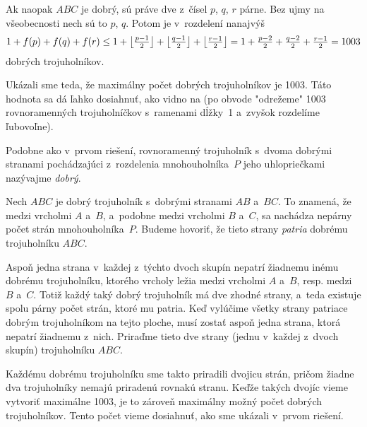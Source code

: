 {Ak naopak $ABC$ je dobrý, sú práve dve z~čísel $p$, $q$, $r$ párne. Bez ujmy na všeobecnosti nech sú to $p$, $q$. Potom je v~rozdelení nanajvýš
$$
1+f(p)+f(q)+f(r) \le 1+\left\lfloor\tfrac{p-1}2\right\rfloor+\left\lfloor\tfrac{q-1}2\right\rfloor+\left\lfloor\tfrac{r-1}2\right\rfloor = 1+\tfrac{p-2}2+\tfrac{q-2}2+\tfrac{r-1}2=1003
$$
dobrých trojuholníkov.

Ukázali sme teda, že maximálny počet dobrých trojuholníkov je 1003. Táto hodnota sa dá ľahko dosiahnuť, ako vidno na \obr{} (po obvode "odrežeme" 1003 rovnoramenných trojuholníčkov s~ramenami dĺžky~1 a~zvyšok rozdelíme ľubovoľne).

\ineriesenie
Podobne ako v~prvom riešení, rovnoramenný trojuholník s~dvoma dobrými stranami pochádzajúci z~rozdelenia mnohouholníka~$P$ jeho uhlopriečkami nazývajme {\it dobrý}.

Nech $ABC$ je dobrý trojuholník s~dobrými stranami $AB$ a~$BC$. To znamená, že medzi vrcholmi $A$ a~$B$, a~podobne medzi vrcholmi $B$ a~$C$, sa nachádza nepárny počet strán mnohouholníka~$P$. Budeme hovoriť, že tieto strany {\it patria\/} dobrému trojuholníku $ABC$.

Aspoň jedna strana v~každej z~týchto dvoch skupín nepatrí žiadnemu inému dobrému trojuholníku, ktorého vrcholy ležia medzi vrcholmi $A$ a~$B$, resp. medzi $B$ a~$C$. Totiž každý taký dobrý trojuholník má dve zhodné strany, a~teda existuje spolu párny počet strán, ktoré mu patria. Keď vylúčime všetky strany patriace dobrým trojuholníkom na tejto ploche, musí zostať aspoň jedna strana, ktorá nepatrí žiadnemu z~nich. Priraďme tieto dve strany (jednu v~každej z~dvoch skupín) trojuholníku $ABC$. 

Každému dobrému trojuholníku sme takto priradili dvojicu strán, pričom žiadne dva trojuholníky nemajú priradenú rovnakú stranu. Keďže takých dvojíc vieme vytvoriť maximálne 1003, je to zároveň maximálny možný počet dobrých trojuholníkov. Tento počet vieme dosiahnuť, ako sme ukázali v~prvom riešení.   
}

